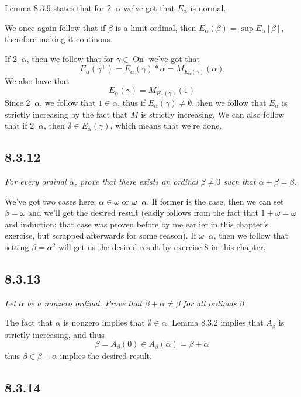 \documentclass[11pt,oneside,titlepage]{book}
\DeclareMathOperator \On {On}
\DeclareMathOperator \ineq {\underline{\in}}
\begin{document}
Lemma 8.3.9 states that for $2 \ineq \alpha$ we've got that $E_\alpha$ is normal.

We once again follow that if $\beta$ is a limit ordinal, then
$E_\alpha(\beta) = \sup{E_\alpha[\beta]}$, therefore making it continous.

If $2 \ineq \alpha$, then we follow that for $\gamma \in \On$ we've got that
$$E_\alpha(\gamma^+) = E_\alpha(\gamma) * \alpha = M_{E_\alpha(\gamma)}(\alpha)$$
We also have that 
$$E_\alpha(\gamma) = M_{E_\alpha(\gamma)}(1)$$
Since $2 \ineq \alpha$, we follow that $1 \in \alpha$, thus if $E_\alpha(\gamma) \neq \emptyset$,
then we follow that $E_\alpha$ is strictly increasing by the fact that $M$ is strictly increasing.
We can also follow that if $2 \ineq \alpha$, then $\emptyset \in E_\alpha(\gamma)$, which
means that we're done.

\subsection*{8.3.12}

\textit{For every ordinal $\alpha$, prove that there exists an ordinal $\beta \neq 0$ such that
  $\alpha + \beta = \beta$.}

We've got two cases here: $\alpha \in \omega$ or $\omega \ineq \alpha$. If former is the
case, then we can set $\beta = \omega$ and we'll get the desired result (easily follows
from the fact that $1 + \omega = \omega$ and induction; that case was proven before
by me earlier in this chapter's exercise, but scrapped afterwards for some reason).
If $\omega \ineq \alpha$, then we follow that setting $\beta = \alpha^2$ will get us
the desired result by exercise 8 in this chapter.

\subsection*{8.3.13}

\textit{Let $\alpha$ be a nonzero ordinal. Prove that $\beta + \alpha \neq \beta$ for
  all ordinals $\beta$}

The fact that $\alpha$ is nonzero implies that $\emptyset \in \alpha$.
Lemma 8.3.2 implies that $A_\beta$ is strictly increasing, and thus 
$$\beta = A_\beta(0) \in A_\beta(\alpha) = \beta + \alpha$$
thus $\beta \in \beta + \alpha$ implies the desired result.

\subsection*{8.3.14}
\end{document}

